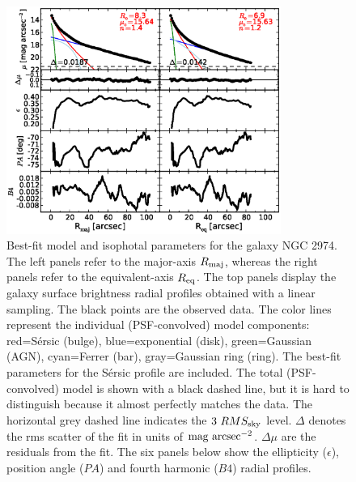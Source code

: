 \documentclass[preprint2]{emulateapj}
\newcommand{\fitfigurewidth}{0.8\textwidth}
\begin{document}
\begin{figure}[h]
\begin{center}
\includegraphics[width=\fitfigurewidth]{images/n2974_1Dfit.eps}
\caption{Best-fit model and isophotal parameters for the galaxy NGC 2974. 
The left panels refer to the major-axis $R_{\rm maj}$, 
whereas the right panels refer to the equivalent-axis $R_{\rm eq}$.
The top panels display the galaxy surface brightness radial profiles obtained with a linear sampling. 
The black points are the observed data.  
The color lines represent the individual (PSF-convolved) model components:
red=S\'ersic (bulge), blue=exponential (disk), green=Gaussian (AGN), cyan=Ferrer (bar), gray=Gaussian ring (ring). 
The best-fit parameters for the S\'ersic profile are included.
The total (PSF-convolved) model is shown with a black dashed line, 
but it is hard to distinguish because it almost perfectly matches the data.
The horizontal grey dashed line indicates the $3~RMS_{\rm sky}$ level.
$\Delta$ denotes the rms scatter of the fit in units of $\rm mag~arcsec^{-2}$.
$\Delta \mu$ are the residuals from the fit.
The six panels below show the ellipticity ($\epsilon$), position angle ($PA$) and fourth harmonic ($B4$) radial profiles.}
\label{fig:n2974ex}
\end{center}
\end{figure}
\end{document}
